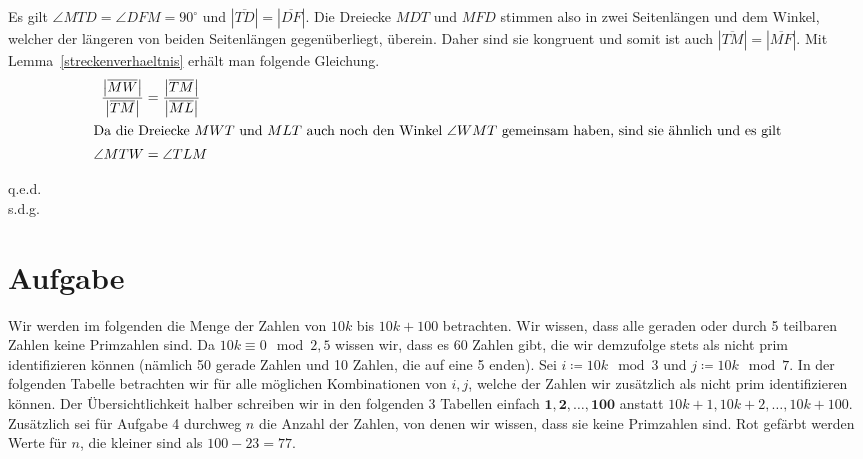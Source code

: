 \documentclass{article}
\newcommand{\strecke}[1]{\left|\overline{#1}\right|}
\newcommand{\myqed}{\begin{flushright} q.e.d.\\ s.d.g.\end{flushright}}
\begin{document}
    \noindent Es gilt $\angle MTD = \angle DFM = 90^{\circ}$ und $\strecke{TD} = \strecke{DF}$.
    Die Dreiecke $MDT$ und $MFD$ stimmen also in zwei Seitenlängen und dem Winkel, welcher der längeren von beiden Seitenlängen gegenüberliegt, überein. Daher sind sie kongruent und somit ist auch $\strecke{TM} = \strecke{MF}$.
    Mit Lemma~\ref{streckenverhaeltnis} erhält man folgende Gleichung.
    \begin{align*}
        \dfrac{\strecke{MW}}{\strecke{TM}} &= \dfrac{\strecke{TM}}{\strecke{ML}}\\
        \intertext{Da die Dreiecke $MWT$ und $MLT$ auch noch den Winkel $\angle WMT$ gemeinsam haben, sind sie ähnlich und es gilt}
        \angle MTW &= \angle TLM\\
    \end{align*}
    \myqed
    \newpage
    \section{Aufgabe}
    Wir werden im folgenden die Menge der Zahlen von $10k$ bis $10k+100$ betrachten. Wir wissen, dass alle geraden oder durch 5 teilbaren Zahlen keine Primzahlen sind. Da $10 k \equiv 0 \mod 2, 5$ wissen wir, dass es 60 Zahlen gibt, die wir demzufolge stets als nicht prim identifizieren können (nämlich 50 gerade Zahlen und 10 Zahlen, die auf eine 5 enden).
    Sei $i \coloneqq 10k \mod 3$ und $j \coloneqq 10k \mod 7$.
    In der folgenden Tabelle betrachten wir für alle möglichen Kombinationen von $i, j$, welche der Zahlen wir zusätzlich als nicht prim identifizieren können. Der Übersichtlichkeit halber schreiben wir in den folgenden 3 Tabellen einfach $\mathbf{1}, \mathbf{2}, \mathbf{\dots}, \mathbf{100}$ anstatt $10k+1, 10k+2, \dots, 10k+100$. Zusätzlich sei für Aufgabe 4 durchweg $n$ die Anzahl der Zahlen, von denen wir wissen, dass sie keine Primzahlen sind. Rot gefärbt werden Werte für $n$, die kleiner sind als $100-23 = 77$.\\\ \\
\end{document}
